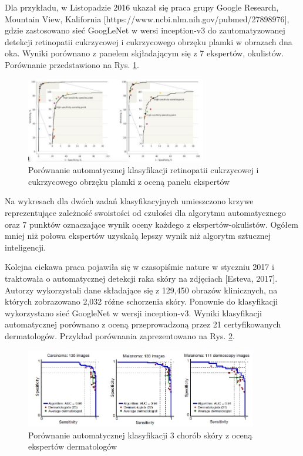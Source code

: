  Dla przykładu, w Listopadzie 2016 ukazał się praca grupy Google Research, Mountain View, Kalifornia [https://www.ncbi.nlm.nih.gov/pubmed/27898976], gdzie zastosowano sieć GoogLeNet w wersi inception-v3 do zautomatyzowanej detekcji retinopatii cukrzycowej i cukrzycowego obrzęku plamki w obrazach dna oka. Wyniki porównano z panelem skjładającym się z 7 ekspertów, okulistów. Porównanie przedstawiono na Rys. \ref{CAD_opto}.
 \begin{figure}[h!]
 	\centering
 	\includegraphics[width=0.7\textwidth]{figures/CAD-okulisci.jpg}
 	\caption{Porównanie automatycznej klasyfikacji retinopatii cukrzycowej i cukrzycowego obrzęku plamki z oceną panelu ekspertów}
 	\label{CAD_opto}
 \end{figure}
 
 Na wykresach dla dwóch zadań klasyfikacyjnych umieszczono krzywe reprezentujące zależność swoistości od czułości dla algorytmu automatycznego oraz 7 punktów oznaczające wynik oceny każdego z ekspertów-okulistów. Ogółem mniej niż połowa ekspertów uzyskałą lepszy wynik niż algorytm sztucznej inteligencji.
 
 Kolejna ciekawa praca pojawiła się w czasopiśmie nature w styczniu 2017 i traktowała o automatycznej detekcji raka skóry na zdjęciach [Esteva, 2017]. Autorzy wykorzystali dane składające się z 129,450 obrazów klinicznych, na których zobrazowano 2,032 różne schorzenia skóry. Ponownie do klasyfikacji wykorzystano sieć GoogleNet w wersji inception-v3. Wyniki klasyfikacji automatycznej porównano z oceną przeprowadzoną przez 21 certyfikowanych dermatologów. Przykład porównania zaprezentowano na Rys. \ref{CAD_derma}. 
 
 \begin{figure}[h!]
 	\centering
 	\includegraphics[width=0.9\textwidth]{figures/CAD-dermatolodzy.jpg}
 	\caption{Porównanie automatycznej klasyfikacji 3 chorób skóry z oceną ekspertów dermatologów}
 	\label{CAD_derma}
 \end{figure}

